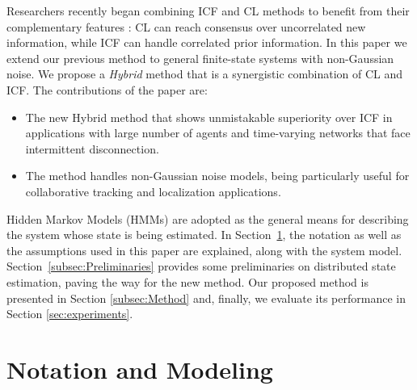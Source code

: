 \documentclass[conference]{IEEEtran}
\theoremstyle{remark}
\begin{document}
Researchers recently began combining ICF and CL 
methods to benefit from their complementary features 
\cite{battistelli2016stability,battistelli2014parallel,tamjidi2016unifying}: CL 
can reach consensus over uncorrelated new information, while ICF can handle  
correlated prior information. 
In this paper we extend our previous method \cite{tamjidi2016unifying} to 
general finite-state systems with non-Gaussian noise. We propose a 
\emph{Hybrid} method that is a synergistic combination of CL and ICF.
The contributions of the 
paper are:
\begin{itemize}
\item The new Hybrid method that shows unmistakable superiority over ICF in applications with large number of agents and time-varying networks that face intermittent disconnection. 
\item The method handles non-Gaussian noise models, being particularly useful for collaborative tracking and localization applications.
\end{itemize}

Hidden Markov Models (HMMs) are adopted as the general means for describing the system whose state is being estimated.  
In Section~\ref{subsec:assump_not}, the notation as well 
as the assumptions used in this paper are explained, along with the system model. Section~\ref{subsec:Preliminaries} provides
some preliminaries on distributed state estimation, paving the way for the new  
method. Our proposed method is presented in Section \ref{subsec:Method} and, finally, we evaluate its performance in Section 
\ref{sec:experiments}.  

\section{Notation and Modeling} \label{subsec:assump_not}
\end{document}
